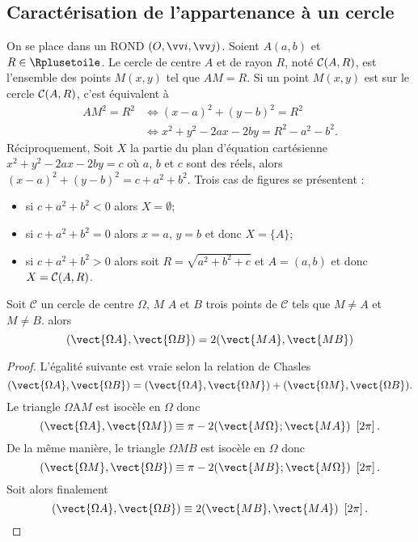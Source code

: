 \subsection{Caractérisation de l'appartenance à un cercle}
\label{sec:caractcercle}
On se place dans un ROND $(O,\vi,\vj)$. Soient $A(a,b)$ et $R \in \Rplusetoile$. Le cercle de centre $A$ et de rayon $R$, noté $\mathcal{C}(A,R)$, est l'ensemble des points $M(x,y)$ tel que $AM=R$. Si un point $M(x,y)$ est sur le cercle $\mathcal{C}(A,R)$, c'est équivalent à
\begin{align}
  AM^2=R^2 & \iff (x-a)^2+(y-b)^2=R^2\\
&\iff x^2+y^2-2ax-2by=R^2-a^2-b^2.
\end{align}
Réciproquement, Soit $X$ la partie du plan d'équation cartésienne $x^2+y^2-2ax-2by=c$ où $a$, $b$ et $c$ sont des réels, alors $(x-a)^2+(y-b)^2=c+a^2+b^2$. Trois cas de figures se présentent :
\begin{itemize}
\item si $c+a^2+b^2<0$ alors $X=\emptyset$;
\item si $c+a^2+b^2=0$ alors $x=a$, $y=b$ et donc $X=\{A\}$;
\item si $c+a^2+b^2>0$ alors soit $R=\sqrt{a^2+b^2+c}$ et $A=(a,b)$ et donc $X=\mathcal{C}(A,R)$.
\end{itemize}
\begin{prop}
  \label{prop:cocy}
  Soit $\mathcal{C}$ un cercle de centre $\Omega$, $M$ $A$ et $B$ trois points de $\mathcal{C}$ tels que $M \neq A$ et $M \neq B$. alors 
  \begin{equation}
    (\vect{\Omega A},\vect{\Omega B})=2 (\vect{MA},\vect{MB})
  \end{equation}
\end{prop}
\begin{proof}
  L'égalité suivante est vraie selon la relation de Chasles
  \begin{equation}
    (\vect{\Omega A},\vect{\Omega B}) = (\vect{\Omega A},\vect{\Omega M}) + (\vect{\Omega M},\vect{\Omega B}).
  \end{equation}
  Le triangle $\Omega $A$ M$ est isocèle en $\Omega$ donc
  \begin{equation}
    \congru{(\vect{\Omega A}, \vect{\Omega M})}{\pi - 2 (\vect{M\Omega}; \vect{MA})}{2\pi}.
  \end{equation}
  De la même manière, le triangle $\Omega M B$ est isocèle en $\Omega$ donc
  \begin{equation}
    \congru{(\vect{\Omega M}, \vect{\Omega B})}{\pi - 2 (\vect{MB}; \vect{M\Omega})}{2\pi}.
  \end{equation}
  Soit alors finalement 
  \begin{equation}
    \congru{(\vect{\Omega A}, \vect{\Omega B})}{2 (\vect{MB}, \vect{MA})}{2\pi}.
\end{equation}
\end{proof}
